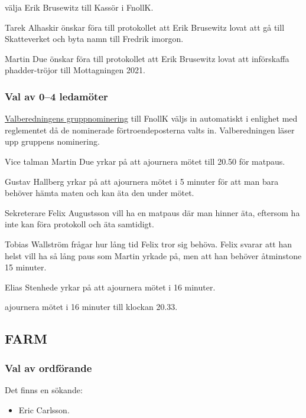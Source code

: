 \documentclass[hidelinks]{sektionsmote}
\begin{document}
\begin{beslut}
  \item välja Erik Brusewitz till Kassör i FnollK.
\end{beslut}
Tarek Alhaskir önskar föra till protokollet att Erik Brusewitz lovat att gå till Skatteverket och byta namn till Fredrik imorgon.\par
Martin Due önskar föra till protokollet att Erik Brusewitz lovat att införskaffa phadder-tröjor till Mottagningen 2021.

\subsubsection{Val av 0--4 ledamöter}
\hyperlink{bilagor/nomfnollk.pdf.1}{Valberedningens gruppnominering} till FnollK väljs in automatiskt i enlighet med reglementet då de nominerade förtroendeposterna valts in.
Valberedningen läser upp gruppens nominering.

\begin{ofraga}
  Vice talman Martin Due yrkar på att ajournera mötet till 20.50 för matpaus.\par
  Gustav Hallberg yrkar på att ajournera mötet i 5 minuter för att man bara behöver hämta maten och kan äta den under mötet.\par
  Sekreterare Felix Augustsson vill ha en matpaus där man hinner äta, eftersom ha inte kan föra protokoll och äta samtidigt.\par
  Tobias Wallström frågar hur lång tid Felix tror sig behöva.
  Felix svarar att han helst vill ha så lång paus som Martin yrkade på, men att han behöver åtminstone 15 minuter.\par
  Elias Stenhede yrkar på att ajournera mötet i 16 minuter.
  \begin{beslut}
    \item ajournera mötet i 16 minuter till klockan 20.33.
  \end{beslut}
\end{ofraga}

\subsection{FARM}
\subsubsection{Val av ordförande}
Det finns en sökande:
\begin{itemize}
    \item Eric Carlsson.
\end{itemize}
\end{document}
